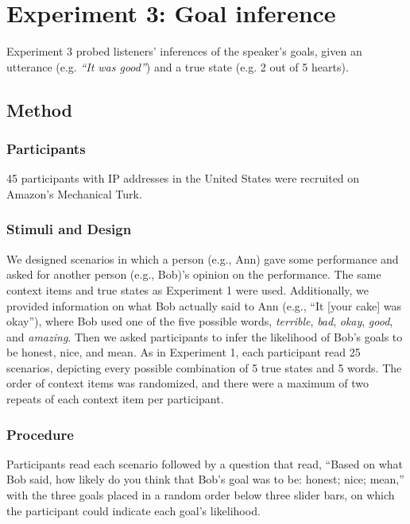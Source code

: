 \documentclass[10pt,letterpaper]{article}
\begin{document}
\section{Experiment 3: Goal inference}


Experiment 3 probed listeners' inferences of the speaker's goals, given an utterance (e.g. \emph{``It was good''}) and a true state (e.g. 2 out of 5 hearts). 

\subsection{Method} 

\subsubsection{Participants}

45 participants with IP addresses in the United States were recruited on Amazon's Mechanical Turk. 

\subsubsection{Stimuli and Design}

We designed scenarios in which a person (e.g., Ann) gave some performance and asked for another person (e.g., Bob)'s opinion on the performance. The same context items and true states as Experiment 1 were used. Additionally, we provided information on what Bob actually said to Ann (e.g., ``It [your cake] was okay''), where Bob used one of the five possible words,  \emph{terrible}, \emph{bad}, \emph{okay}, \emph{good}, and \emph{amazing}. Then we asked participants to infer the likelihood of Bob's goals to be honest, nice, and mean. As in Experiment 1, each participant read 25 scenarios, depicting every possible combination of 5 true states and 5 words.
The order of context items was randomized, and there were a maximum of two repeats of each context item per participant.

\subsubsection{Procedure}
Participants read each scenario followed by a question that read, ``Based on what Bob said, how likely do you think that Bob's goal was to be: honest; nice; mean,'' with the three goals placed in a random order below three slider bars, on which the participant could indicate each goal's likelihood.
\end{document}
